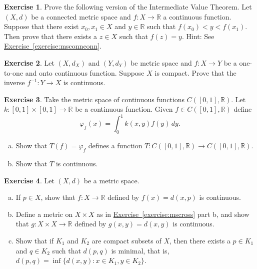 \documentclass[12pt,openany]{book}
\newcommand{\R}{{\mathbb{R}}}
\newcommand{\myindex}[1]{#1\index{#1}}
\theoremstyle{plain}
\theoremstyle{remark}
\theoremstyle{definition}
\newenvironment{exbox}{%
    \def\FrameCommand{\vrule width 1pt \relax\hspace {10pt}}%
    \MakeFramed {\advance \hsize -\width \FrameRestore }%
}{%
    \endMakeFramed
}
\newenvironment{exparts}{%
    \leavevmode\begin{enumerate}[a),noitemsep,topsep=0pt,parsep=0pt,partopsep=0pt]
}{%
    \end{enumerate}
}
\theoremstyle{exercise}
\newtheorem{exercise}{Exercise}[section]
\theoremstyle{example}
\newcommand{\exerciseref}[1]{\hyperref[#1]{Exercise~\ref*{#1}}}
\begin{document}
\begin{exbox}
\begin{exercise}
Prove the following version of the
Intermediate Value Theorem.  Let $(X,d)$ be a connected
metric space and $f \colon X \to \R$ a continuous function.  Suppose that
there exist $x_0,x_1 \in X$ and $y \in \R$ such that $f(x_0) < y < f(x_1)$.
Then prove that there exists a $z \in X$ such that $f(z) = y$.
Hint: See \exerciseref{exercise:msconnconn}.
\end{exercise}


\begin{exercise}
Let $(X,d_X)$ and $(Y,d_Y)$ be metric space and
$f \colon X \to Y$ be a one-to-one and onto continuous function.  Suppose
$X$ is compact.  Prove that the inverse $f^{-1} \colon Y \to X$
is continuous.
\end{exercise}

\begin{exercise}
Take the metric space of continuous functions $C([0,1],\R)$.  Let
$k \colon [0,1] \times [0,1] \to \R$ be a continuous function.
Given $f \in C([0,1],\R)$ define
\begin{equation*}
\varphi_f(x) = \int_0^1 k(x,y) f(y)  \, dy .
\end{equation*}
\begin{exparts}
\item
Show that $T(f) = \varphi_f$ defines a function $T \colon C([0,1],\R) \to
C([0,1],\R)$.
\item
Show that $T$ is continuous.
\end{exparts}
\end{exercise}

\begin{samepage}
\begin{exercise}
Let $(X,d)$ be a metric space.
\begin{exparts}
\item
If $p \in X$,
show that $f \colon X \to \R$ defined
by $f(x) = d(x,p)$ is continuous.
\item
Define a metric on $X \times X$ as in \exerciseref{exercise:mscross} part
b, and show that $g \colon X \times X \to \R$ defined by
$g(x,y) = d(x,y)$ is continuous.
\item
Show that if $K_1$ and $K_2$ are compact subsets of $X$, then
there exists a $p \in K_1$ and $q \in K_2$ such that $d(p,q)$ is minimal,
that is, $d(p,q) = \inf \{ d(x,y) \colon x \in K_1, y \in K_2 \}$.
\end{exparts}
\end{exercise}
\end{samepage}


\end{exbox}
\end{document}
